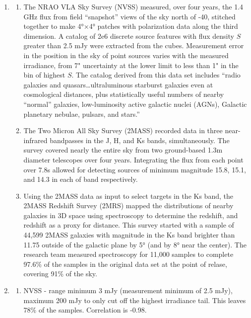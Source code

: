 \documentclass{paper}
\begin{document}
\begin{enumerate}
  \item
    \begin{enumerate}
      \item
        The NRAO VLA Sky Survey (NVSS) measured, over four years, the 1.4 
        GHz flux from field ``snapshot'' views of the sky north of -40, 
        stitched together to make 4°×4° patches with polarization data along 
        the third dimension. A catalog of 2e6 discrete source features with 
        flux density $S$ greater than 2.5 mJy were extracted from the cubes. 
        Measurement error in the position in the sky of point sources varies 
        with the measured irradiance, from 7" uncertainty at the lower limit 
        to less than 1" in the bin of highest $S$. The catalog derived from
        this data set includes ``radio galaxies and quasars\ldots ultraluminous 
        starburst galaxies even at cosmological distances, plus statistically 
        useful numbers of nearby ``normal'' galaxies, low-luminosity 
        active galactic nuclei (AGNs), Galactic planetary nebulae, pulsars, 
        and stars.''\cite{Condon_1998}

      \item
        The Two Micron All Sky Survey (2MASS) recorded data in three 
        near-infrared bandpasses in the J, H, and Ks bands, simultaneously. 
        The survey covered nearly the entire sky from two ground-based 1.3m 
        diameter telescopes over four years. Integrating the flux from each 
        point over 7.8s allowed for detecting sources of minimum magnitude 
        15.8, 15.1, and 14.3 in each of band respectively.\cite{Skrutskie_2006}

      \item
        Using the 2MASS data as input to select targets in the Ks band, the
        2MASS Redshift Survey (2MRS) mapped the distributions of nearby
        galaxies in 3D space using spectroscopy to determine the redshift, 
        and redshift as a proxy for distance. This survey started with a 
        sample of 44,599 2MASS galaxies with magnitude in the Ks band  
        brighter than 11.75 outside of the galactic plane by 5° (and by 8°
        near the center). The research team measured spectroscopy for 11,000
        samples to complete 97.6\% of the samples in the original data set at 
        the point of relase, covering 91\% of the sky.\cite{Huchra_2012}

    \end{enumerate}

  \item
    \begin{enumerate}
      \item
        NVSS - range minimum 3 mJy (measurement minimum of 2.5 mJy), 
        maximum 200 mJy to only cut off the highest irradiance tail. This
        leaves 78\% of the samples. Correlation is -0.98.


\end{enumerate}
\end{enumerate}
\end{document}
